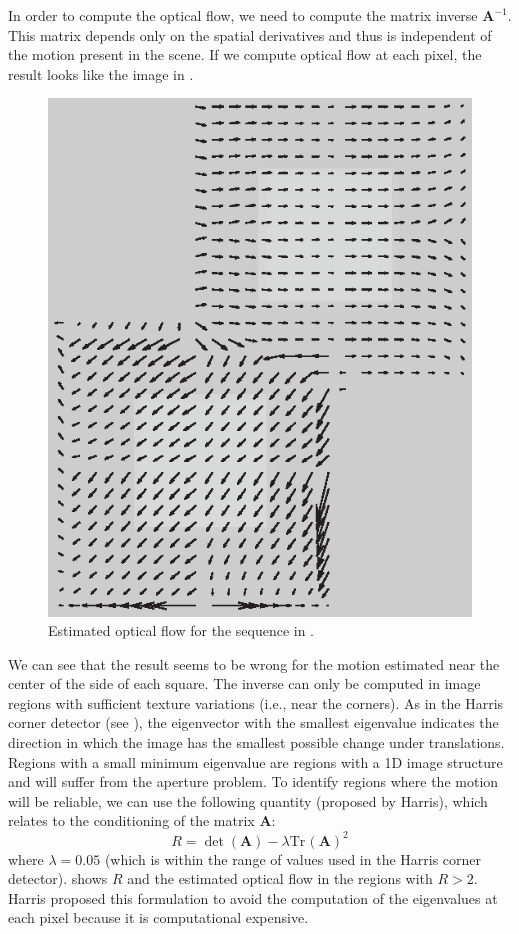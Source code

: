 In order to compute the optical flow, we need to compute the matrix inverse $\mathbf{A}^{-1}$.  This matrix depends only on the spatial derivatives and thus is independent of the motion present in the scene. If we compute optical flow at each pixel, the result looks like the image in \fig{\ref{fig:square_grandient_based_5}}.
\vspace{-0.2in}
\begin{figure}[h!]
    \centerline{
        \includegraphics[width=.25\linewidth]{figures/optical_flow/square_grandient_based_5.eps}
    }
    \caption{Estimated optical flow for the sequence in \fig{\ref{fig:square_grandient_based_2}}.}
    \label{fig:square_grandient_based_5}
\end{figure}
\vspace{-0.2in}

We can see that the result seems to be wrong for the motion estimated near the center of the side of each square. The inverse can only be computed in image regions with sufficient texture variations (i.e., near the corners). As in the Harris corner detector (see \sect{\ref{sec:finding_image_features}}), the  eigenvector with the smallest eigenvalue indicates the direction in which the image has the smallest possible change under translations. Regions with a small minimum eigenvalue are regions with a 1D image structure and will suffer from the aperture problem. To identify regions where the motion will be reliable, we can use the following quantity (proposed by Harris), which relates to the conditioning of the matrix $\mathbf{A}$:
\begin{equation}
    R = \det (\mathbf{A}) - \lambda \mathrm{Tr}\hspace{1pt} (\mathbf{A})^2
\end{equation}
where $\lambda=0.05$ (which is within the range of values used in the Harris corner detector). \Fig{\ref{fig:square_grandient_based_4}} shows $R$ and the estimated optical flow in the regions with $R > 2$. Harris proposed this formulation to avoid the computation of the eigenvalues at each pixel because it is computational expensive.

